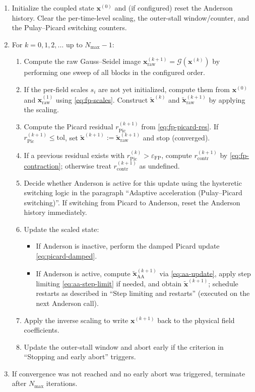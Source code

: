 \begin{enumerate}
  \item Initialize the coupled state $\mathbf{x}^{(0)}$ and (if configured) reset the Anderson history. Clear the per-time-level scaling, the outer-stall window/counter, and the Pulay--Picard switching counters.
  \item For $k=0,1,2,\dots$ up to $N_{\max}-1$:
  \begin{enumerate}
    \item Compute the raw Gauss--Seidel image $\mathbf{x}_{\mathrm{raw}}^{(k+1)}=\mathcal{G}(\mathbf{x}^{(k)})$ by performing one sweep of all blocks in the configured order.
    \item If the per-field scales $s_i$ are not yet initialized, compute them from $\mathbf{x}^{(0)}$ and $\mathbf{x}_{\mathrm{raw}}^{(1)}$ using \eqref{eq:fp-scales}. Construct $\widetilde{\mathbf{x}}^{(k)}$ and $\widetilde{\mathbf{x}}_{\mathrm{raw}}^{(k+1)}$ by applying the scaling.
    \item Compute the Picard residual $r_{\mathrm{Pic}}^{(k+1)}$ from \eqref{eq:fp-picard-res}. If $r_{\mathrm{Pic}}^{(k+1)}\le \mathrm{tol}$, set $\widetilde{\mathbf{x}}^{(k+1)}:=\widetilde{\mathbf{x}}_{\mathrm{raw}}^{(k+1)}$ and stop (converged).
    \item If a previous residual exists with $r_{\mathrm{Pic}}^{(k)}>\varepsilon_{\mathrm{FP}}$, compute $r_{\mathrm{contr}}^{(k+1)}$ by \eqref{eq:fp-contraction}; otherwise treat $r_{\mathrm{contr}}^{(k+1)}$ as undefined.
    \item Decide whether Anderson is active for this update using the hysteretic switching logic in the paragraph ``Adaptive acceleration (Pulay--Picard switching)''. If switching from Picard to Anderson, reset the Anderson history immediately.
    \item Update the scaled state:
    \begin{itemize}
      \item If Anderson is inactive, perform the damped Picard update \eqref{eq:picard-damped}.
      \item If Anderson is active, compute $\widetilde{\mathbf{x}}_{\mathrm{AA}}^{(k+1)}$ via \eqref{eq:aa-update}, apply step limiting \eqref{eq:aa-step-limit} if needed, and obtain $\widetilde{\mathbf{x}}^{(k+1)}$; schedule restarts as described in ``Step limiting and restarts'' (executed on the next Anderson call).
    \end{itemize}
    \item Apply the inverse scaling to write $\mathbf{x}^{(k+1)}$ back to the physical field coefficients.
    \item Update the outer-stall window and abort early if the criterion in ``Stopping and early abort'' triggers.
  \end{enumerate}
  \item If convergence was not reached and no early abort was triggered, terminate after $N_{\max}$ iterations.
\end{enumerate}
